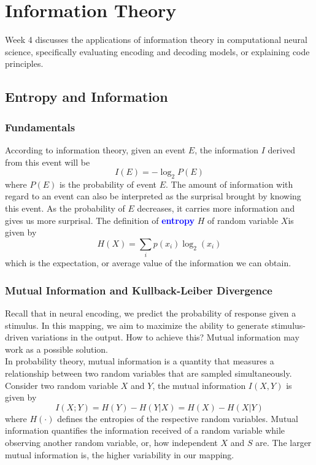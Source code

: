 \documentclass[11pt]{article}
\begin{document}
\newpage
\section{Information Theory}
Week 4 discusses the applications of information theory in computational neural science, specifically evaluating encoding and decoding models, or explaining code principles.

\subsection{Entropy and Information}
\subsubsection{Fundamentals}
According to information theory, given an event $E$, the information $I$ derived from this event will be
\[I(E)=-\log_2P(E)\]
where $P(E)$ is the probability of event $E$. The amount of information with regard to an event can also be interpreted as the surprisal brought by knowing this event. As the probability of $E$ decreases, it carries more information and gives us more surprisal. The definition of \textcolor{Blue}{\textbf{entropy}} $H$ of random variable $X $is given by
\[H(X)=\sum_i p(x_i)\log_2 (x_i)\]
which is the expectation, or average value of the information we can obtain. 
\subsubsection{Mutual Information and Kullback-Leiber Divergence}
Recall that in neural encoding, we predict the probability of response given a stimulus. In this mapping, we aim to maximize the ability to generate stimulus-driven variations in the output. How to achieve this? Mutual information may work as a possible solution.
\\

In probability theory, mutual information is a quantity that measures a relationship between two random variables that are sampled simultaneously. Consider two random variable $X$ and $Y$, the mutual information $I(X, Y)$ is given by 
\[I(X; Y)= H(Y)-H(Y|X)=H(X)-H(X|Y)\]
where $H(·)$ defines the entropies of the respective random variables. Mutual information quantifies the information received of a random variable while observing another random variable, or, how independent $X$ and $S$ are. The larger mutual information is, the higher variability in our mapping. 
\\
\end{document}
